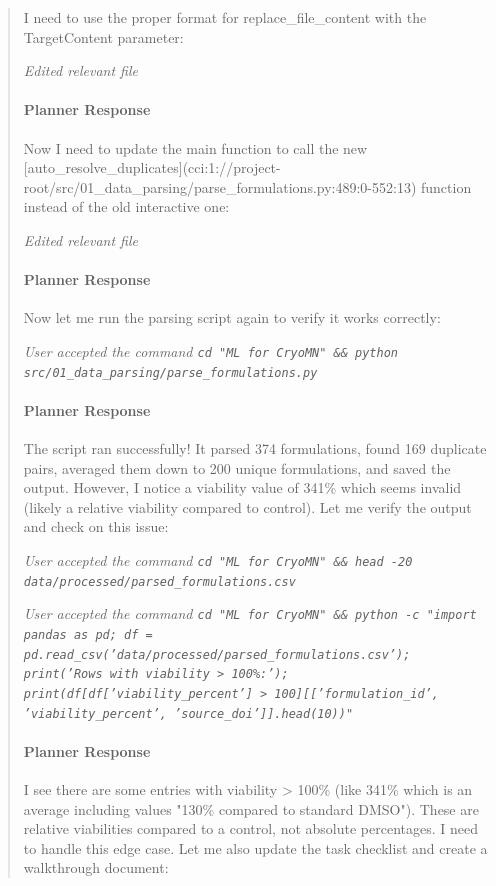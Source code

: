 \documentclass[preprint,12pt]{elsarticle}
\newenvironment{promptbar}{\begin{quote}\scriptsize\raggedright\sloppy}{\end{quote}}
\begin{document}
\begin{promptbar}
I need to use the proper format for replace\_file\_content with the TargetContent parameter:

\textit{Edited relevant file}

\paragraph*{Planner Response}

Now I need to update the main function to call the new [auto\_resolve\_duplicates](cci:1://project-root/src/01\_data\_parsing/parse\_formulations.py:489:0-552:13) function instead of the old interactive one:

\textit{Edited relevant file}

\paragraph*{Planner Response}

Now let me run the parsing script again to verify it works correctly:

\textit{User accepted the command \texttt{cd "ML for CryoMN" \&\& python src/01\_data\_parsing/parse\_formulations.py}}

\paragraph*{Planner Response}

The script ran successfully! It parsed 374 formulations, found 169 duplicate pairs, averaged them down to 200 unique formulations, and saved the output. However, I notice a viability value of 341\% which seems invalid (likely a relative viability compared to control). Let me verify the output and check on this issue:

\textit{User accepted the command \texttt{cd "ML for CryoMN" \&\& head -20 data/processed/parsed\_formulations.csv}}

\textit{User accepted the command \texttt{cd "ML for CryoMN" \&\& python -c "import pandas as pd; df = pd.read\_csv('data/processed/parsed\_formulations.csv'); print('Rows with viability > 100\%:'); print(df[df['viability\_percent'] > 100][['formulation\_id', 'viability\_percent', 'source\_doi']].head(10))"}}

\paragraph*{Planner Response}

I see there are some entries with viability > 100\% (like 341\% which is an average including values "130\% compared to standard DMSO"). These are relative viabilities compared to a control, not absolute percentages. I need to handle this edge case. Let me also update the task checklist and create a walkthrough document:


\end{promptbar}
\end{document}
